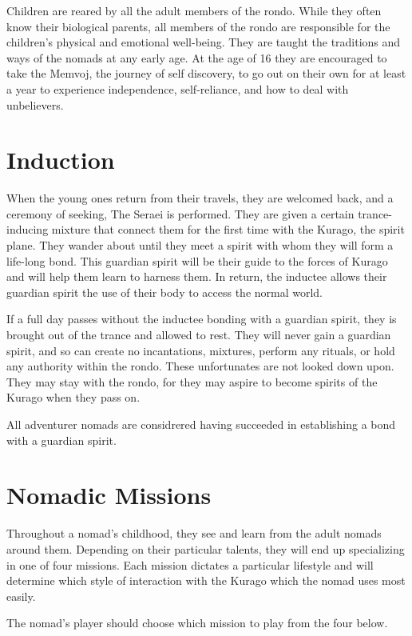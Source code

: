 Children are reared by all the adult members of the rondo. While they often know their biological parents, all members of the rondo are responsible for the children's physical and emotional well-being. They are taught the  traditions and ways of the nomads at any early age. At the age of 16 they are encouraged to take the Memvoj, the journey of self discovery, to go out on their own for at least a year to experience independence, self-reliance, and how to deal with unbelievers.

\section{Induction}

When the young ones return from their travels, they are welcomed back, and a ceremony of seeking, The Seraei is performed. They are given a certain trance-inducing mixture that connect them for the first time with the Kurago, the spirit plane. They wander about until they meet a spirit with whom they will form a life-long bond. This guardian spirit will be their guide to the forces of Kurago and will help them learn to harness them. In return, the inductee allows their guardian spirit the use of their body to access the normal world.

If a full day passes without the inductee bonding with a guardian spirit, they is brought out of the trance and allowed to rest. They will never gain a guardian spirit, and so can create no incantations, mixtures, perform any rituals, or hold any authority within the rondo. These unfortunates are not looked down upon. They may stay with the rondo, for they may aspire to become spirits of the Kurago when they pass on.

All adventurer nomads are considrered having succeeded in establishing a bond with a guardian spirit.

\section{Nomadic Missions}

Throughout a nomad's childhood, they see and learn from the adult nomads around them. Depending on their particular talents, they will end up specializing in one of four missions. Each mission dictates a particular lifestyle and will determine which style of interaction with the Kurago which the nomad uses most easily.

The nomad's player should choose which mission to play from the four below.

